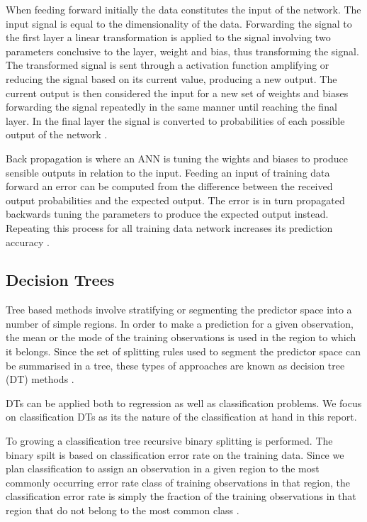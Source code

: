 
When feeding forward initially the data constitutes the input of the network. The input signal is equal to the dimensionality of the data. Forwarding the signal to the first layer a linear transformation is applied to the signal involving two parameters conclusive to the layer, weight and bias, thus transforming the signal. The transformed signal is sent through a activation function amplifying or reducing the signal based on its current value, producing a new output. The current output is then considered the input for a new set of weights and biases forwarding the signal repeatedly in the same manner until reaching the final layer. In the final layer the signal is converted to probabilities of each possible output of the network \parencite{Bishop:2006}.

Back propagation is where an ANN is tuning the wights and biases to produce sensible outputs in relation to the input. Feeding an input of training data forward an error can be computed from the difference between the received output probabilities and the expected output. The error is in turn propagated backwards tuning the parameters to produce the expected output instead. Repeating this process for all training data network increases its prediction accuracy \parencite{Bishop:2006}.

\subsection{Decision Trees}

Tree based methods involve stratifying or segmenting the predictor space into a number of simple regions. In order to make a prediction for a given observation, the mean or the mode of the training observations is used in the region to which it belongs. Since the set of splitting rules used
to segment the predictor space can be summarised in a tree, these types of approaches are known as decision tree (DT) methods \parencite{James:2014}.

DTs can be applied both to regression as well as classification problems. We focus on classification DTs as its the nature of the classification at hand in this report.

To growing a classification tree recursive
binary splitting is performed. The binary spilt is based on classification error rate on the training data. Since we plan classification to assign an observation in a given region to the most commonly occurring error rate class of training observations in that region, the classification error rate is simply the fraction of the training observations in that region that do not belong to the most common class \parencite{James:2014}.

